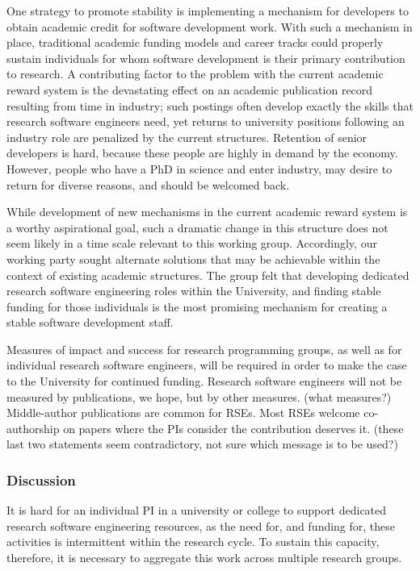 One strategy to promote stability is implementing a mechanism for developers to obtain academic
credit for software development work. With such a mechanism in place, traditional academic funding
models and career tracks could properly sustain individuals for whom software development is their
primary contribution to research. A contributing factor to the problem with the current academic reward system is the
devastating effect on an academic
publication record resulting from time in industry; such postings often develop exactly the skills that research software
engineers need, yet returns to university positions following an industry role are penalized by the current structures.
Retention of senior developers is hard, because these people are highly in demand by the economy. However, people who have a
PhD in science and enter industry, may desire to return for diverse reasons, and should be welcomed back.

While development of new mechanisms in the current academic reward system is a worthy aspirational goal, such a dramatic
change in this structure does not seem likely in a time scale relevant to this working group. Accordingly, our working party
sought alternate solutions that may be achievable within the context of existing academic structures. The group felt that
developing dedicated research software engineering roles within the University, and finding stable funding for those individuals is the most promising mechanism for creating a stable software development staff.

Measures of impact and success for research programming groups, as well as for individual research software engineers, will
be required in order to make the case to the University for continued funding. Research software engineers will not be measured by publications, we hope, but by other measures. (what measures?) Middle-author publications are common for RSEs. Most RSEs welcome co-authorship on papers where the PIs consider the contribution deserves it.
(these last two statements seem contradictory, not sure which message is to be used?)

\subsubsection{Discussion}

It is hard for an individual PI in a university or college to support dedicated research software engineering resources, as
the need for, and funding for, these activities is intermittent within the research cycle. To sustain this capacity, therefore, it is necessary to aggregate this work across multiple research groups.


